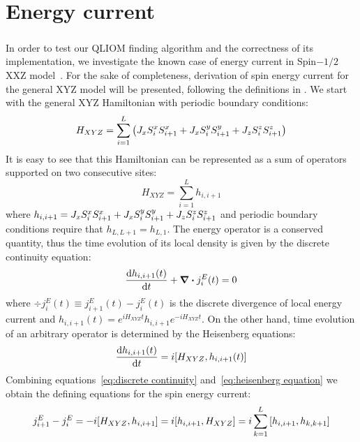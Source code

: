 \chapter{Energy current}
\thispagestyle{chapterBeginStyle}
\label{chap:energy current}

\paragraph{}In order to test our QLIOM finding algorithm and the correctness of its implementation, we investigate the known case of
energy current in Spin\(-1/2\) XXZ model~\autocite*{Mierzejewski2015Approx}. For the sake of completeness, derivation of
spin energy current for the general XYZ model will be presented, following the definitions in \textcite{Zotos1997}.
We start with the general XYZ Hamiltonian with periodic boundary conditions:
\begin{equation}
    H_{XYZ} = \sum_{i=1}^L  \left( J_{x} S^{x}_{i}S^{x}_{i+1} + J_{x} S^{y}_{i}S^{y}_{i+1} + J_{z} S^{z}_{i}S^{z}_{i+1} \right)
\end{equation}
It is easy to see that this Hamiltonian can be represented as a sum of operators supported on two consecutive sites:
\begin{equation}
    H_{XYZ} = \sum_{i=1}^L h_{i,i+1}
\end{equation}
where \(h_{i,i+1} = J_{x} S^{x}_{i}S^{x}_{i+1} + J_{x} S^{y}_{i}S^{y}_{i+1} + J_{z} S^{z}_{i}S^{z}_{i+1} \) and periodic boundary conditions
require that \(h_{L,L+1} = h_{L,1}\). The energy operator is a conserved quantity, thus the time evolution of its local density
is given by the discrete continuity equation:
\begin{equation}
    \dv{h_{i,i+1}(t)}{t} + \div{j_{i}^{E}(t)} = 0 
    \label{eq:discrete continuity}
\end{equation}
where \(\div{j_{i}^E(t)} \equiv j_{i+1}^E(t) - j_{i}^E(t)\) is the discrete divergence of local energy current and \(h_{i,i+1}(t) = e^{i H_{XYZ}t} h_{i,i+1} e^{-i H_{XYZ} t}\).
On the other hand, time evolution of an arbitrary operator is determined
by the Heisenberg equations:
\begin{equation}
    \dv{h_{i,i+1}(t)}{t} = i \comm{H_{XYZ}}{h_{i,i+1}(t)}
    \label{eq:heisenberg equation}
\end{equation}
Combining equations~\eqref{eq:discrete continuity} and~\eqref{eq:heisenberg equation} we obtain the defining equations for
the spin energy current:
\begin{equation}
    j_{i+1}^E - j_{i}^E = - i \comm{H_{XYZ}}{h_{i,i+1}} = i \comm{h_{i,i+1}}{H_{XYZ}} = i \sum_{k=1}^L \comm{h_{i,i+1}}{h_{k,k+1}} 
    \label{eq:energy current defining equation}
\end{equation}
